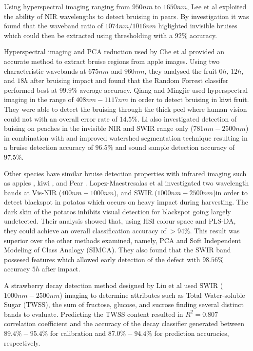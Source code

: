 \documentclass[fleqn,twoside]{article}
\begin{document}
Using hyperspectral imaging ranging from $950nm$ to $1650nm$, Lee et al \cite{lee} exploited the ability of NIR wavelengths to detect bruising in pears. By investigation it was found that the waveband ratio of $1074nm/1016nm$ higlighted invisible bruises which could then be extracted using thresholding with a $92\%$ accuracy. 

Hyperspectral imaging and PCA reduction used by Che et al \cite{che} provided an accurate method to extract bruise regions from apple images. Using two characteristic wavebands at $675nm$ and $960 nm$, they analysed the fruit $0h$, $12h$, and $18h$ after bruising impact and found that the Random Forrest classifer performed best at $99.9\%$ average accuracy. Qiang and Mingjie \cite{qiang} used hyperspectral imaging  in the range of $408nm-1117nm$ in order to detect bruising in kiwi fruit. They were able to detect the bruising through the thick peel where human vision could not with an overall error rate of $14.5\%$. Li \cite{li3} also investigated detection of buising on peaches in the invisible NIR and SWIR range only ($781nm-2500nm$) in combination with and improved watershed segmentation technique resulting in a bruise detection accuracy of $96.5\%$ and sound sample detection accuracy of $97.5\%$.

Other species have similar bruise detection properties with infrared imaging such as apples \cite{che}, kiwi \cite{qiang}, and Pear \cite{lee}. Lopez-Maestresalas et al \cite{ainara} investigated two wavelength bands at Vis-NIR ($400nm-1000nm$), and SWIR ($1000nm-2500nm$)in order to detect blackspot in potatos which occurs on heavy impact during harvesting. The dark skin of the potatos inhibits visual detection for blackspot going largely undetected. Their analysis showed that, using HSI colour space and PLS-DA, they could achieve an overall classification accuracy of $>94\%$. This result was superior over the other methods examined, namely, PCA and Soft Independent Modeling of Class Analogy (SIMCA). They also found that the SWIR band possesed features which allowed early detection of the defect with $98.56\%$ accuracy $5h$ after impact.

A strawberry decay detection method designed by Liu et al \cite{liu2} used SWIR ($1000nm-2500nm$) imaging to determine attributes such as Total Water-soluble Sugar (TWSS), the sum of fructose, glucose, and sucrose finding several distinct bands to evaluate. Predicting the TWSS content resulted in $R^2=0.807$ correlation coefficient and the accuracy of the decay classifier generated between $89.4\%-95.4\%$ for calibration and $87.0\%-94.4\%$ for prediction accuracies, respectively.
\end{document}
